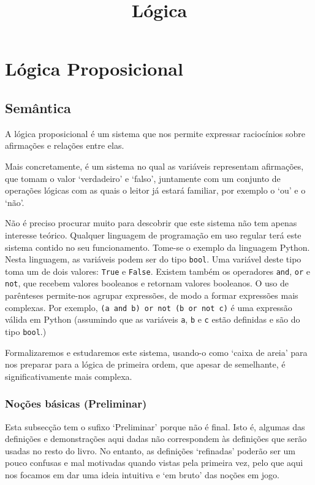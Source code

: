 \documentclass{report}
\title{Lógica}
\author{}
\date{}
\theoremstyle{definition}
\theoremstyle{remark}
\begin{document}
	\maketitle
	\newpage
	
	\tableofcontents
	\newpage
	
	\chapter{Lógica Proposicional}
	
	\section{Semântica}
	
	A lógica proposicional é um sistema que nos permite expressar raciocínios sobre afirmações e relações entre elas.
	
	Mais concretamente, é um sistema no qual as variáveis representam afirmações, que tomam o valor `verdadeiro' e `falso', juntamente com um conjunto de operações lógicas com as quais o leitor já estará familiar, por exemplo o `ou' e o `não'.
	
	Não é preciso procurar muito para descobrir que este sistema não tem apenas interesse teórico. Qualquer linguagem de programação em uso regular terá este sistema contido no seu funcionamento. Tome-se o exemplo da linguagem Python. Nesta linguagem, as variáveis podem ser do tipo \texttt{bool}. Uma variável deste tipo toma um de dois valores: \texttt{True} e \texttt{False}. Existem também os operadores \texttt{and}, \texttt{or} e \texttt{not}, que recebem valores booleanos e retornam valores booleanos. O uso de parênteses permite-nos agrupar expressões, de modo a formar expressões mais complexas. Por exemplo, \texttt{(a and b) or not (b or not c)} é uma expressão válida em Python (assumindo que as variáveis \texttt{a}, \texttt{b} e \texttt{c} estão definidas e são do tipo \texttt{bool}.)
	
	Formalizaremos e estudaremos este sistema, usando-o como `caixa de areia' para nos preparar para a lógica de primeira ordem, que apesar de semelhante, é significativamente mais complexa.
	
	\subsection{Noções básicas (Preliminar)}
	
	Esta subsecção tem o sufixo `Preliminar' porque não é final. Isto é, algumas das definições e demonstrações aqui dadas não correspondem às definições que serão usadas no resto do livro. No entanto, as definições `refinadas' poderão ser um pouco confusas e mal motivadas quando vistas pela primeira vez, pelo que aqui nos focamos em dar uma ideia intuitiva e `em bruto' das noções em jogo.
	
\end{document}
